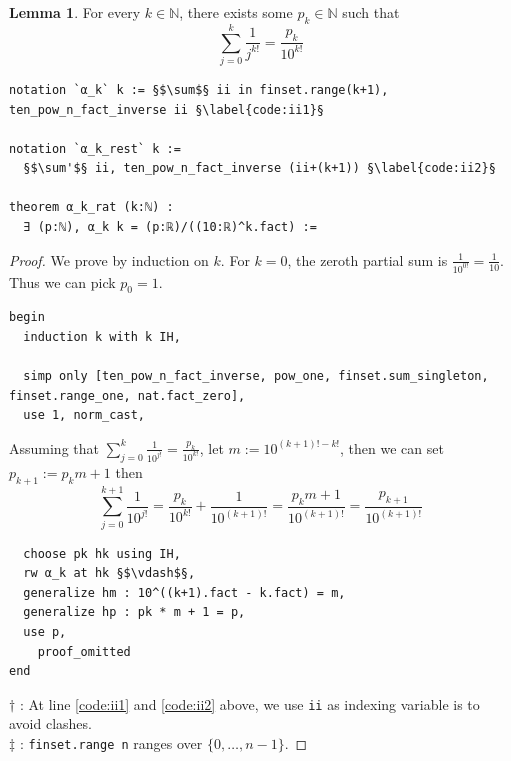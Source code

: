 \documentclass{report}
\theoremstyle{definition}
\newtheorem{lemma}{Lemma}[section]
\begin{document}
\begin{lemma}\label{lemma:partialSum}
For every $k\in\mathbb N$, there exists some $p_k\in\mathbb N$ such that
$$
\sum_{j=0}^k\frac1{j^{k!}}=\frac{p_k}{10^{k!}}
$$
\begin{verbatim}
notation `α_k` k := §$\sum$§ ii in finset.range(k+1), ten_pow_n_fact_inverse ii §\label{code:ii1}§

notation `α_k_rest` k := 
  §$\sum'$§ ii, ten_pow_n_fact_inverse (ii+(k+1)) §\label{code:ii2}§

theorem α_k_rat (k:ℕ) : 
  ∃ (p:ℕ), α_k k = (p:ℝ)/((10:ℝ)^k.fact) :=
\end{verbatim}
\end{lemma}

\begin{proof}
We prove by induction on $k$. For $k=0$, the zeroth partial sum is $\frac1{10^{0!}}=\frac1{10}$. Thus we can pick $p_0=1$.

\begin{verbatim}
begin
  induction k with k IH,

  simp only [ten_pow_n_fact_inverse, pow_one, finset.sum_singleton, finset.range_one, nat.fact_zero], 
  use 1, norm_cast, 
\end{verbatim}

Assuming that $\sum_{j=0}^k\frac1{10^{j!}}=\frac{p_k}{10^{k!}}$, let $m:=10^{(k+1)!-k!}$, then we can set $p_{k+1}:=p_k m+1$ then
$$
\sum_{j=0}^{k+1}\frac1{10^{j!}}=\frac{p_k}{10^{k!}}+\frac1{10^{(k+1)!}}=\frac{p_km+1}{10^{(k+1)!}}=\frac{p_{k+1}}{10^{(k+1)!}}
$$
\begin{verbatim}                                                                            
  choose pk hk using IH,
  rw α_k at hk §$\vdash$§,
  generalize hm : 10^((k+1).fact - k.fact) = m,
  generalize hp : pk * m + 1 = p,
  use p,
    proof_omitted
end
\end{verbatim}
$\dagger$ : At line \ref{code:ii1} and \ref{code:ii2} above, we use {\tt \small ii} as indexing variable is to avoid clashes.\\
$\ddagger$ : {\tt finset.range n} ranges over $\{0,\dots,n-1\}$.
\end{proof}
\end{document}
